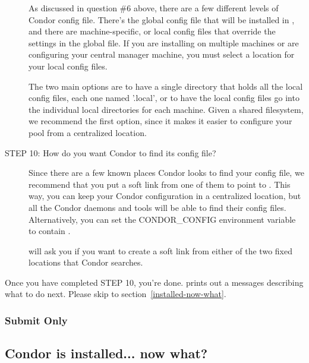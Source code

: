 \begin{description}
     As discussed in question \#6 above, there are a few different
     levels of Condor config file.  There's the global config file
     that will be installed in , and
     there are machine-specific, or local config files that override
     the settings in the global file.  If you are installing on
     multiple machines or are configuring your central manager
     machine, you must select a location for your local config files. 

     The two main options are to have a single directory that holds
     all the local config files, each one named '.local',
     or to have the local config files go into the individual local
     directories for each machine.  Given a shared filesystem, we
     recommend the first option, since it makes it easier to configure
     your pool from a centralized location.


\item[STEP 10: How do you want Condor to find its config file?]

     Since there are a few known places Condor looks to find your
     config file, we recommend that you put a soft link from one of
     them to point to .  This way, you
     can keep your Condor configuration in a centralized location, but
     all the Condor daemons and tools will be able to find their
     config files.  Alternatively, you can set the CONDOR\_CONFIG
     environment variable to contain .

      will ask you if you want to create a soft link
     from either of the two fixed locations that Condor searches.

\end{description}

Once you have completed STEP 10, you're done.   prints
out a messages describing what to do next.  Please skip to 
section~\ref{installed-now-what}.

\subsubsection{\label{Install-Submit-Only}
Submit Only}

\Todo

\subsection{\label{installed-now-what}
Condor is installed... now what?}

